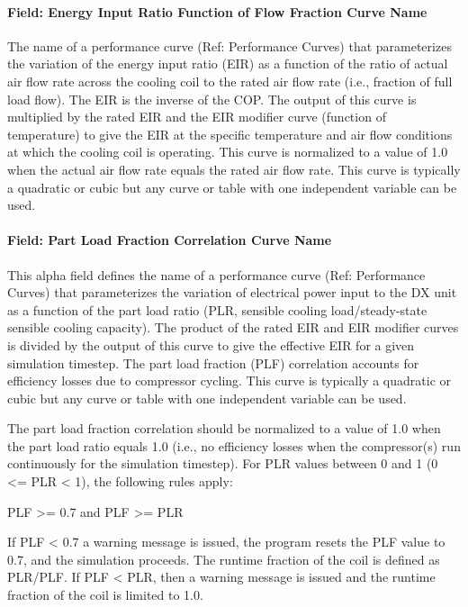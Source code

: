 \paragraph{Field: Energy Input Ratio Function of Flow Fraction Curve Name}\label{field-energy-input-ratio-function-of-flow-fraction-curve-name}

The name of a performance curve (Ref: Performance Curves) that parameterizes the variation of the energy input ratio (EIR) as a function of the ratio of actual air flow rate across the cooling coil to the rated air flow rate (i.e., fraction of full load flow). The EIR is the inverse of the COP. The output of this curve is multiplied by the rated EIR and the EIR modifier curve (function of temperature) to give the EIR at the specific temperature and air flow conditions at which the cooling coil is operating. This curve is normalized to a value of 1.0 when the actual air flow rate equals the rated air flow rate. This curve is typically a quadratic or cubic but any curve or table with one independent variable can be used.

\paragraph{Field: Part Load Fraction Correlation Curve Name}\label{field-part-load-fraction-correlation-curve-name-2}

This alpha field defines the name of a performance curve (Ref: Performance Curves) that parameterizes the variation of electrical power input to the DX unit as a function of the part load ratio (PLR, sensible cooling load/steady-state sensible cooling capacity). The product of the rated EIR and EIR modifier curves is divided by the output of this curve to give the effective EIR for a given simulation timestep. The part load fraction (PLF) correlation accounts for efficiency losses due to compressor cycling. This curve is typically a quadratic or cubic but any curve or table with one independent variable can be used.

The part load fraction correlation should be normalized to a value of 1.0 when the part load ratio equals 1.0 (i.e., no efficiency losses when the compressor(s) run continuously for the simulation timestep). For PLR values between 0 and 1 (0 \textless{}= PLR \textless{} 1), the following rules apply:

PLF \textgreater{}= 0.7 and PLF \textgreater{}= PLR

If PLF \textless{} 0.7 a warning message is issued, the program resets the PLF value to 0.7, and the simulation proceeds. The runtime fraction of the coil is defined as PLR/PLF. If PLF \textless{} PLR, then a warning message is issued and the runtime fraction of the coil is limited to 1.0.

